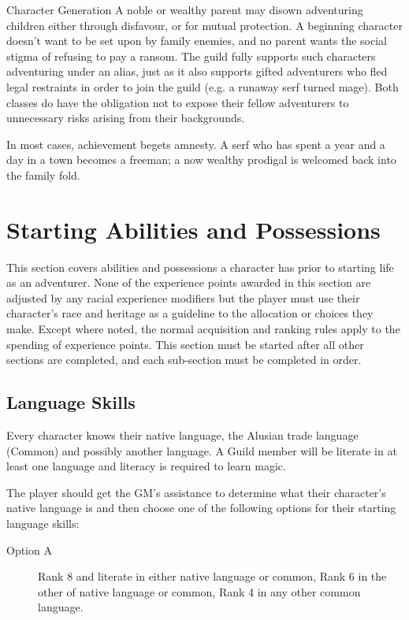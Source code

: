 \begin{Chapter}{Character Generation}
A noble or wealthy parent may disown adventuring children either
through disfavour, or for mutual protection.  A beginning character
doesn’t want to be set upon by family enemies, and no parent wants the
social stigma of refusing to pay a ransom.  The guild fully supports
such characters adventuring under an alias, just as it also supports
gifted adventurers who fled legal restraints in order to join the
guild (e.g. a runaway serf turned mage).  Both classes do have the
obligation not to expose their fellow adventurers to unnecessary risks
arising from their backgrounds.

In most cases, achievement begets amnesty.  A serf who has spent a
year and a day in a town becomes a freeman; a now wealthy prodigal is
welcomed back into the family fold.


\section{Starting Abilities and Possessions}
\label{starting}

This section covers abilities and possessions a character has prior to
starting life as an adventurer.  None of the experience points awarded
in this section are adjusted by any racial experience modifiers but
the player must use their character’s race and heritage as a guideline
to the allocation or choices they make. Except where noted, the normal
acquisition and ranking rules apply to the spending of experience
points.  This section must be started after all other sections are
completed, and each sub-section must be completed in order.

\subsection{Language Skills}

Every character knows their native language, the Alusian trade
language (Common) and possibly another language. A Guild member will
be literate in at least one language and literacy is required to learn
magic.

The player should get the GM’s assistance to determine what their
character’s native language is and then choose one of the following
options for their starting language skills:

\begin{description}

\item[Option A] Rank 8 and literate in either native language or
  common, Rank 6 in the other of native language or common, Rank 4 in
  any other common language.


\end{description}
\end{Chapter}
